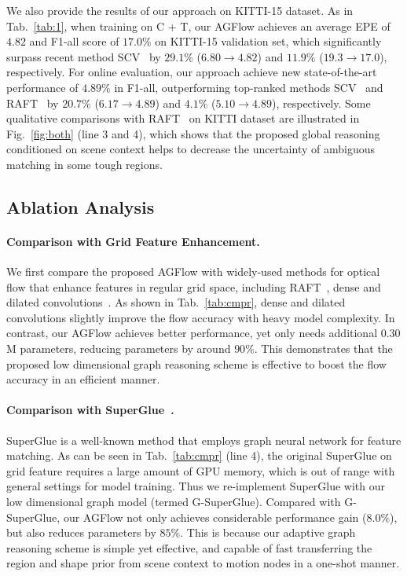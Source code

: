 \documentclass[letterpaper]{article} %
\begin{document}
We also provide the results of our approach on KITTI-15 dataset. As in Tab.~\ref{tab:1}, when training on C + T, our AGFlow achieves an average EPE of $4.82$ and F1-all score of $17.0\% $ on KITTI-15 validation set, which significantly surpass recent method SCV~\cite{Jiang2021LearningOF} by $29.1\%$ ($6.80 \rightarrow 4.82$) and $11.9\%$ ($19.3 \rightarrow 17.0$), respectively. For online evaluation, our approach achieve new state-of-the-art performance of $4.89\%$ in F1-all, outperforming top-ranked methods SCV~\cite{Jiang2021LearningOF} and RAFT~\cite{Teed2020RAFTRA} by $20.7\%$ ($6.17\rightarrow 4.89$) and $4.1\%$ ($5.10 \rightarrow 4.89$), respectively. Some qualitative comparisons with RAFT~\cite{Teed2020RAFTRA} on KITTI dataset are illustrated in Fig.~\ref{fig:both} (line 3 and 4), which shows that the proposed global reasoning conditioned on scene context helps to decrease the uncertainty of ambiguous matching in some tough regions.

\subsection{Ablation Analysis} \label{sec:4}

\paragraph{Comparison with Grid Feature Enhancement.}
We first compare the proposed AGFlow with widely-used methods for optical flow that enhance features in regular grid space, including RAFT~\cite{Teed2020RAFTRA}, dense and dilated convolutions~\cite{Sun2018PWCNetCF, Hur2019IterativeRR}. As shown in Tab.~\ref{tab:cmpr}, dense and dilated convolutions slightly improve the flow accuracy with heavy model complexity. In contrast, our AGFlow achieves better performance, yet only needs additional $0.30$ M parameters, reducing parameters by around $90\%$. This demonstrates that the proposed low dimensional graph reasoning scheme is effective to boost the flow accuracy in an efficient manner.

\paragraph{Comparison with SuperGlue~\cite{Sarlin2020SuperGlueLF}.} SuperGlue is a well-known method that employs graph neural network for feature matching. As can be seen in Tab.~\ref{tab:cmpr} (line 4), the original SuperGlue on grid feature requires a large amount of GPU memory, which is out of range with general settings for model training. Thus we re-implement SuperGlue with our low dimensional graph model (termed G-SuperGlue). Compared with G-SuperGlue, our AGFlow not only achieves considerable performance gain ($8.0\%$), but also reduces parameters by $85\%$. This is because our adaptive graph reasoning scheme is simple yet effective, and capable of fast transferring the region and shape prior from scene context to motion nodes in a one-shot manner.
\end{document}
